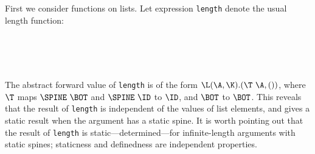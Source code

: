 \documentclass[11pt]{article}
\begin{document}
First we consider functions on lists.
Let expression \mbox{\tt length} denote the usual length function:
\begin{flushleft}
\vspace{-0.0em}\vspace{-0.0em}\\
\vspace{-0.0em}\\
\vspace{-0.0em}\\
\vspace{-0.0em}
\end{flushleft}
The abstract forward value of \mbox{\tt length} is of the form
$\L(\A,\K).(\T~\A,())$, where $\T$ maps $\SPINE~\BOT$ and $\SPINE~\ID$
to $\ID$, and $\BOT$ to $\BOT$.  This reveals that the result of
\mbox{\tt length} is independent of the values of list elements, and gives
a static result when the argument has a static spine.  It is worth
pointing out that the result of \mbox{\tt length} is static---determined---for
infinite-length arguments with static spines; staticness and definedness
are independent properties.
\end{document}
